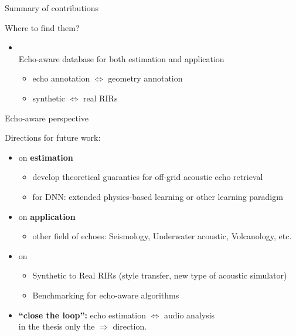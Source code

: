 \begin{frame}[t]{Summary of contributions}
    \begin{block}{}
        \alert{Where to find them?}
        \begin{itemize}
            \item \dechorate
            \\Echo-aware database for both estimation and application{\footnotesize
            \begin{itemize}
                \item echo annotation $\Leftrightarrow$ geometry annotation
                \item synthetic $\Leftrightarrow$ real RIRs
            \end{itemize}}
        \end{itemize}
    \end{block}

\end{frame}

\begin{frame}{Echo-aware perspective}

    Directions for future work:
    \begin{itemize}
        \item[\mytriag] on \textbf{estimation}
        \begin{itemize}\small
            \item develop theoretical guaranties for off-grid acoustic echo retrieval
            \item for DNN: extended physics-based learning or other learning paradigm
            \\
        \end{itemize}

        \vfill
        \item[\mytriag] on \textbf{application}
        \begin{itemize}
            \item other field of echoes: Seismology, Underwater acoustic, Volcanology, etc.
        \end{itemize}

        \vfill
        \item[\mytriag] on \dechorate
        \begin{itemize}
            \item Synthetic to Real RIRs (style transfer, new type of acoustic simulator)
            \item Benchmarking for echo-aware algorithms
        \end{itemize}

        \vfill
        \item[\mytriag] \textbf{``close the loop'':}  echo estimation $\Leftrightarrow$ audio analysis
        \\in the thesis only the $\Rightarrow$ direction.
    \end{itemize}

\end{frame}


